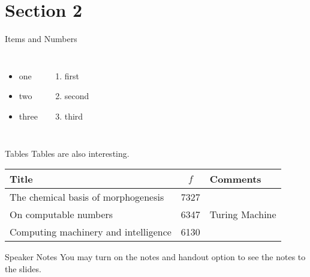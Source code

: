 \documentclass[%
    aspectratio=169, %
    onlytextwidth,   %
]{beamer}
\begin{document}

\section{Section 2}

\begin{frame}[t]{Items and Numbers}
\begin{columns}
            \begin{itemize}
            \item one
            \item two
            \item three
            \end{itemize}
            \begin{enumerate}
            \item first
            \item second
            \item third
            \end{enumerate}
\end{columns}
\end{frame}



\begin{frame}[c]{Tables}
Tables are also interesting.
\begin{table}[ht!]
\centering
\begin{tabular}{|l|c|l|} \hline
Title&$f$&Comments\\ \hline
The chemical basis of morphogenesis & 7327 & \\ \hline
On computable numbers & 6347 & Turing Machine\\ \hline
Computing machinery and intelligence & 6130 & \\ \hline
\end{tabular}
\end{table}
\end{frame}



\begin{frame}[c]{Speaker Notes}
You may turn on the notes and handout option to see the notes to the slides.
\end{frame}
\end{document}
